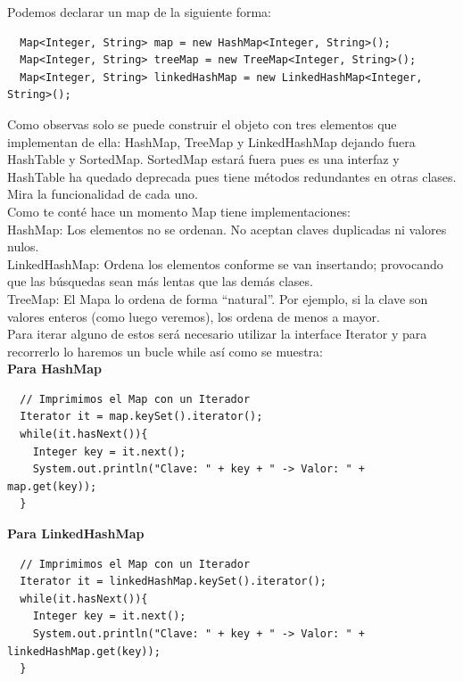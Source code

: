 \documentclass{article}
\begin{document}
Podemos declarar un map de la siguiente forma:\\

\begin{verbatim}
  Map<Integer, String> map = new HashMap<Integer, String>();
  Map<Integer, String> treeMap = new TreeMap<Integer, String>();
  Map<Integer, String> linkedHashMap = new LinkedHashMap<Integer, String>();
\end{verbatim}

Como observas solo se puede construir el objeto con tres elementos que
implementan de ella: HashMap, TreeMap y LinkedHashMap dejando fuera HashTable y
SortedMap. SortedMap estará fuera pues es una interfaz y HashTable ha quedado
deprecada pues tiene métodos redundantes en otras clases. Mira la funcionalidad
de cada uno.\\

Como te conté hace un momento Map tiene implementaciones:\\

HashMap: Los elementos no se ordenan. No aceptan claves duplicadas ni valores
nulos.\\
LinkedHashMap: Ordena los elementos conforme se van insertando; provocando que
las búsquedas sean más lentas que las demás clases.\\
TreeMap: El Mapa lo ordena de forma “natural”. Por ejemplo, si la clave son
valores enteros (como luego veremos), los ordena de menos a mayor.\\

Para iterar alguno de estos será necesario utilizar la interface Iterator y
para recorrerlo lo haremos un bucle while así como se muestra:\\

\textbf{Para HashMap}\\

\begin{verbatim}
  // Imprimimos el Map con un Iterador
  Iterator it = map.keySet().iterator();
  while(it.hasNext()){
    Integer key = it.next();
    System.out.println("Clave: " + key + " -> Valor: " + map.get(key));
  }
\end{verbatim}

\textbf{Para LinkedHashMap}\\

\begin{verbatim}
  // Imprimimos el Map con un Iterador
  Iterator it = linkedHashMap.keySet().iterator();
  while(it.hasNext()){
    Integer key = it.next();
    System.out.println("Clave: " + key + " -> Valor: " + linkedHashMap.get(key));
  }
\end{verbatim}
\end{document}
